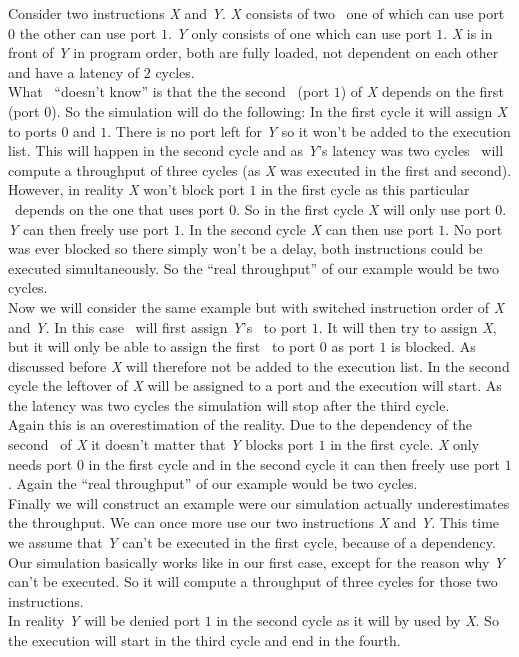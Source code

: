 Consider two instructions \emph{X} and \emph{Y}. \emph{X} consists of two \microops\ one of which can use port $0$ the other can use port $1$. \emph{Y} only consists of one which can use port $1$. \emph{X} is in front of \emph{Y} in program order, both are fully loaded, not dependent on each other and have a latency of $2$ cycles.\\
What \suaca\ ``doesn't know'' is that the the second \microop\ (port $1$) of \emph{X} depends on the first (port $0$). So the simulation will do the following: In the first cycle it will assign \emph{X} to ports $0$ and $1$. There is no port left for \emph{Y} so it won't be added to the execution list. This will happen in the second cycle and as \emph{Y}'s latency was two cycles \suaca\ will compute a throughput of three cycles (as \emph{X} was executed in the first and second).\\
However, in reality \emph{X} won't block port $1$ in the first cycle as this particular \microop\ depends on the one that uses port $0$. So in the first cycle \emph{X} will only use port $0$. \emph{Y} can then freely use port $1$. In the second cycle \emph{X} can then use port $1$. No port was ever blocked so there simply won't be a delay, both instructions could be executed simultaneously. So the ``real throughput'' of our example would be two cycles.\\

Now we will consider the same example but with switched instruction order of \emph{X} and \emph{Y}. In this case \suaca\ will first assign \emph{Y}'s \microop\ to port $1$. It will then try to assign \emph{X}, but it will only be able to assign the first \microop\ to port $0$ as port $1$ is blocked. As discussed before \emph{X} will therefore not be added to the execution list. In the second cycle the leftover of \emph{X} will be assigned to a port and the execution will start. As the latency was two cycles the simulation will stop after the third cycle.\\
Again this is an overestimation of the reality. Due to the dependency of the second \microop\ of \emph{X} it doesn't matter that \emph{Y} blocks port $1$ in the first cycle. \emph{X} only needs port $0$ in the first cycle and in the second cycle it can then freely use port $1$. Again the ``real throughput'' of our example would be two cycles.\\

Finally we will construct an example were our simulation actually underestimates the throughput. We can once more use our two instructions \emph{X} and \emph{Y}. This time we assume that \emph{Y} can't be executed in the first cycle, because of a dependency. Our simulation basically works like in our first case, except for the reason why \emph{Y} can't be executed. So it will compute a throughput of three cycles for those two instructions.\\
In reality \emph{Y} will be denied port $1$ in the second cycle as it will by used by \emph{X}. So the execution will start in the third cycle and end in the fourth.\\

